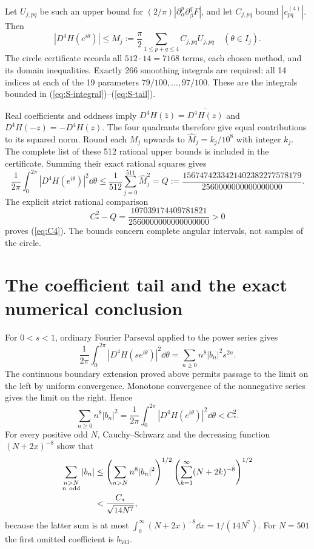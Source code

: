 Let $U_{j,pq}$ be such an upper bound for
$(2/\pi)|\partial_\alpha^p\partial_\beta^qF|$, and let $C_{j,pq}$
bound $|c^{(4)}_{pq}|$. Then
\begin{equation}\label{eq:panel-majorant}
 |D^4H(e^{i\theta})|\leq M_j:=\frac\pi2
             \sum_{1\leq p+q\leq4}C_{j,pq}U_{j,pq}
             \quad(\theta\in I_j).
\end{equation}
The circle certificate records all $512\cdot14=7168$ terms, each
chosen method, and its domain inequalities. Exactly 266 smoothing
integrals are required: all 14 indices at each of the 19 parameters
$79/100,\ldots,97/100$. These are the integrals bounded in
(\ref{eq:S-integral})--(\ref{eq:S-tail}).

Real coefficients and oddness imply
$D^4H(\bar z)=\overline{D^4H(z)}$ and $D^4H(-z)=-D^4H(z)$.
The four quadrants therefore give equal contributions to its squared
norm. Round each $M_j$ upwards to $\widehat M_j=k_j/10^8$ with
integer $k_j$. The complete list of these 512 rational upper bounds is
included in the certificate. Summing their exact rational squares gives
\begin{equation}\label{eq:rational-square}
 \frac1{2\pi}\int_0^{2\pi}|D^4H(e^{i\theta})|^2\dd\theta
 \leq\frac1{512}\sum_{j=0}^{511}\widehat M_j^2
 =Q:=\frac{1567474233421402382277578179}{2560000000000000000}.
\end{equation}
The explicit strict rational comparison
\begin{equation}\label{eq:Cmargin}
 C_*^2-Q=\frac{107039174409781821}{2560000000000000000}>0
\end{equation}
proves (\ref{eq:C4}). The bounds concern complete angular intervals,
not samples of the circle.

\section{The coefficient tail and the exact numerical conclusion}
For $0<s<1$, ordinary Fourier Parseval applied to the power series gives
\[
 \frac1{2\pi}\int_0^{2\pi}|D^4H(se^{i\theta})|^2\dd\theta
       =\sum_{n\geq0}n^8|b_n|^2s^{2n}.
\]
The continuous boundary extension proved above permits passage to the
limit on the left by uniform convergence. Monotone convergence of the
nonnegative series gives the limit on the right. Hence
\begin{equation}\label{eq:parseval-boundary}
 \sum_{n\geq0}n^8|b_n|^2
 =\frac1{2\pi}\int_0^{2\pi}|D^4H(e^{i\theta})|^2\dd\theta<C_*^2.
\end{equation}
For every positive odd $N$, Cauchy--Schwarz and the decreasing function
$(N+2x)^{-8}$ show that
\begin{align}
 \sum_{\substack{n>N\\n\ {\rm odd}}}|b_n|
 &\leq\left(\sum_{n>N}n^8|b_n|^2\right)^{1/2}
        \left(\sum_{k=1}^{\infty}(N+2k)^{-8}\right)^{1/2}\nonumber\\
 &<\frac{C_*}{\sqrt{14N^7}},\label{eq:tail-final}
\end{align}
because the latter sum is at most
$\int_0^\infty(N+2x)^{-8}\dd x=1/(14N^7)$.
For $N=501$ the first omitted coefficient is $b_{503}$.
